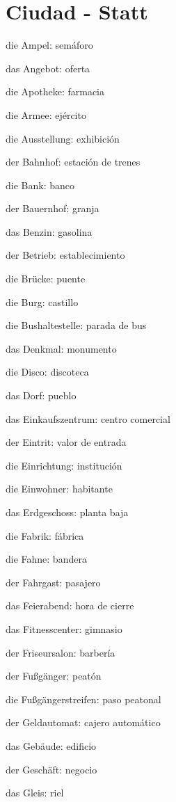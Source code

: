 \section{Ciudad - Statt}
\begin{multicols}{2}
\begin{myitemize}
\item die Ampel: semáforo
\item das Angebot: oferta
\item die Apotheke: farmacia
\item die Armee: ejército
\item die Ausstellung: exhibición
\item der Bahnhof: estación de trenes
\item die Bank: banco
\item der Bauernhof: granja
\item das Benzin: gasolina
\item der Betrieb: establecimiento
\item die Brücke: puente
\item die Burg: castillo
\item die Bushaltestelle: parada de bus
\item das Denkmal: monumento
\item die Disco: discoteca
\item das Dorf: pueblo
\item das Einkaufszentrum: centro comercial
\item der Eintrit: valor de entrada
\item die Einrichtung: institución
\item die Einwohner: habitante
\item das Erdgeschoss: planta baja
\item die Fabrik: fábrica
\item die Fahne: bandera
\item der Fahrgast: pasajero
\item das Feierabend: hora de cierre
\item das Fitnesscenter: gimnasio
\item der Friseursalon: barbería
\item der Fußgänger: peatón
\item die Fußgängerstreifen: paso peatonal
\item der Geldautomat: cajero automático
\item das Gebäude: edificio
\item der Geschäft: negocio
\item das Gleis: riel

\end{myitemize}
\end{multicols}
